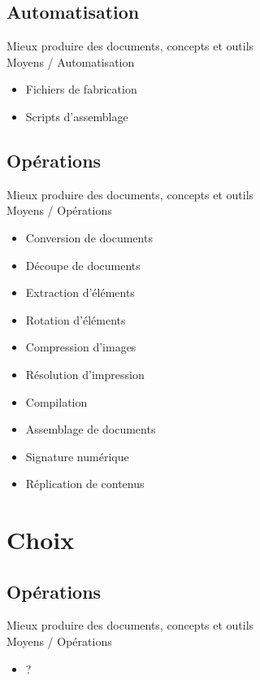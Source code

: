 \documentclass{beamer}
\def\hititle{Mieux produire des documents}
\def\lotitle{concepts et outils}
\def\fulltitle{\hititle, \lotitle}
\begin{document}
\subsection{Automatisation}
\begin{frame}{\fulltitle\\Moyens / Automatisation}
\begin{itemize}
\item<1-> Fichiers de fabrication
\item<2-> Scripts d’assemblage
\end{itemize}
\end{frame}
\subsection{Opérations}
\begin{frame}{\fulltitle\\Moyens / Opérations}
\begin{itemize}
\item<1-> Conversion de documents
\item<2-> Découpe de documents
\item<3-> Extraction d’éléments
\item<4-> Rotation d’éléments
\item<5-> Compression d’images
\item<6-> Résolution d’impression
\item<7-> Compilation
\item<8-> Assemblage de documents
\item<9-> Signature numérique
\item<10-> Réplication de contenus
\end{itemize}
\end{frame}
\section{Choix}
\subsection{Opérations}
\begin{frame}{\fulltitle\\Moyens / Opérations}
\begin{itemize}
\item<1-> ?
\end{itemize}
\end{frame}
\end{document}
